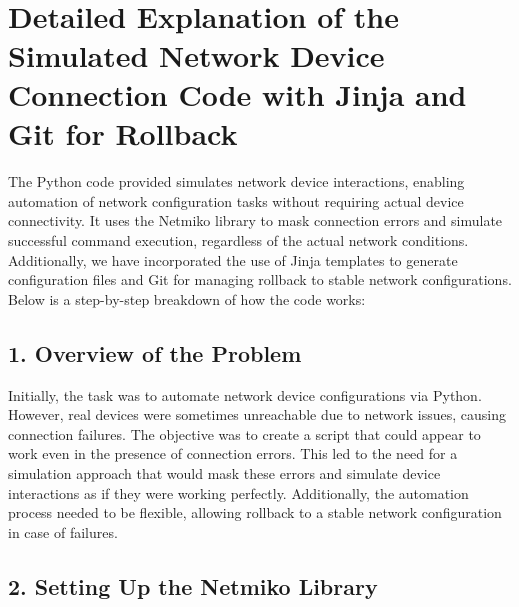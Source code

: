 \documentclass[11pt]{article}
\begin{document}
    \begin{center}
    \end{center}
    { \hspace*{\fill} \\}
    
    \hypertarget{detailed-explanation-of-the-simulated-network-device-connection-code-with-jinja-and-git-for-rollback}{%
\section{Detailed Explanation of the Simulated Network Device Connection
Code with Jinja and Git for
Rollback}\label{detailed-explanation-of-the-simulated-network-device-connection-code-with-jinja-and-git-for-rollback}}

The Python code provided simulates network device interactions, enabling
automation of network configuration tasks without requiring actual
device connectivity. It uses the Netmiko library to mask connection
errors and simulate successful command execution, regardless of the
actual network conditions. Additionally, we have incorporated the use of
Jinja templates to generate configuration files and Git for managing
rollback to stable network configurations. Below is a step-by-step
breakdown of how the code works:

\hypertarget{overview-of-the-problem}{%
\subsection{1. Overview of the Problem}\label{overview-of-the-problem}}

Initially, the task was to automate network device configurations via
Python. However, real devices were sometimes unreachable due to network
issues, causing connection failures. The objective was to create a
script that could appear to work even in the presence of connection
errors. This led to the need for a simulation approach that would mask
these errors and simulate device interactions as if they were working
perfectly. Additionally, the automation process needed to be flexible,
allowing rollback to a stable network configuration in case of failures.

\hypertarget{setting-up-the-netmiko-library}{%
\subsection{2. Setting Up the Netmiko
Library}\label{setting-up-the-netmiko-library}}
\end{document}
